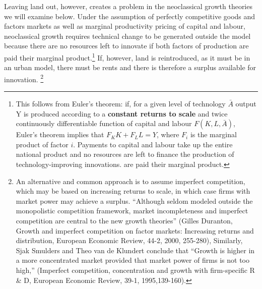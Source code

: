 Leaving land out, however, creates a problem in  the neoclassical growth theories we will examine below. Under the assumption of perfectly competitive goods and factors markets as well as marginal productivity pricing of capital and labour, neoclassical growth requires technical change to be generated outside the model because there are no resources left to innovate if both factors of production are paid their marginal product.\footnote{This follows from Euler’s theorem: if, for a given level of technology $\bar A$ output Y is produced according to a \textbf{constant returns to scale} and twice continuously differentiable function of capital and labour $F(K, L, \bar A)$, Euler’s theorem implies that $F_K K + F_L L=Y$, where $F_i$ is the marginal product of factor $i$. Payments to  capital and labour take up the entire national product and no resources are left to finance the production of technology-improving innovations. are paid their marginal product.} 
If, however, land is reintroduced, as it must be in an urban model, there must be rents and there is therefore a surplus available for innovation.
\footnote{An alternative and common approach is to assume imperfect competition, which may be based on increasing returns to scale, in which case firms with market power may achieve a surplus. ``Although seldom modeled outside the monopolistic competition framework, market incompleteness and imperfect competition are central to the new growth theories'' (Gilles Duranton, Growth and imperfect competition on factor markets: Increasing returns and distribution, European Economic Review, 44-2, 2000, 255-280), Similarly, Sjak Smulders and Theo van de Klundert conclude that ``Growth is higher in a more concentrated market provided that market power of firms is not too high,'' (Imperfect competition, concentration and growth with firm-specific R \& D, European Economic Review, 39-1, 1995,139-160).}



